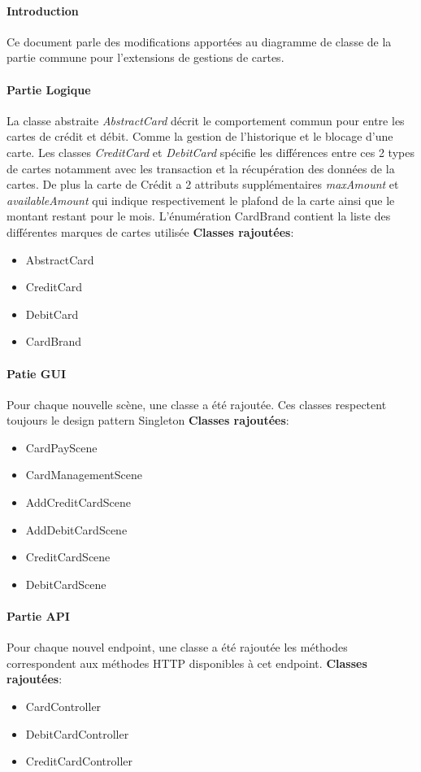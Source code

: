 \documentclass{article}
\begin{document}
\paragraph{Introduction}
Ce document parle des modifications apportées au diagramme de classe
de la partie commune pour l'extensions de gestions de cartes.


\paragraph{Partie Logique}

La classe abstraite \emph{AbstractCard} décrit le comportement commun pour entre les cartes
de crédit et débit. Comme la gestion de l'historique et le blocage d'une carte. Les classes
\emph{CreditCard} et \emph{DebitCard} spécifie les différences entre ces 2 types de cartes
notamment avec les transaction et la récupération des données de la cartes. De plus la carte
de Crédit a 2 attributs supplémentaires \emph{maxAmount} et \emph{availableAmount} qui
indique respectivement le plafond de la carte ainsi que le montant restant pour le mois.
L'énumération CardBrand contient la liste des différentes marques de cartes utilisée
\noindent
\textbf{Classes rajoutées}:
\begin{itemize}
    \item AbstractCard
    \item CreditCard
    \item DebitCard
    \item CardBrand
\end{itemize}


\paragraph{Patie GUI}
Pour chaque nouvelle scène, une classe a été rajoutée. Ces classes respectent toujours le
design pattern Singleton
\newline
\textbf{Classes rajoutées}:
\begin{itemize}
    \item CardPayScene
    \item CardManagementScene
    \item AddCreditCardScene
    \item AddDebitCardScene
    \item CreditCardScene
    \item DebitCardScene
\end{itemize}

\paragraph{Partie API}

Pour chaque nouvel endpoint, une classe a été rajoutée les méthodes correspondent aux méthodes
HTTP disponibles à cet endpoint.
\newline
\textbf{Classes rajoutées}:
\begin{itemize}
    \item CardController
    \item DebitCardController
    \item CreditCardController
\end{itemize}
\end{document}
